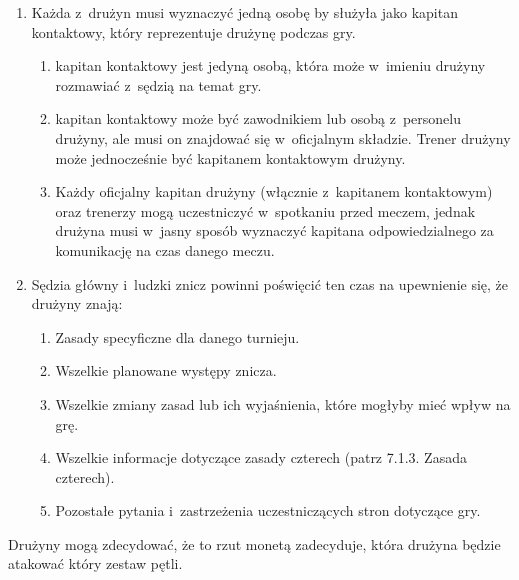 \documentclass[12pt,a4paper]{article}
\renewcommand{\subsubsection}[1]{
  \oldsubsubsection{#1}%
  \leftskip1.3cm
}
\begin{document}
\begin{enumerate}
	\item
	      Każda z~drużyn musi wyznaczyć jedną osobę by służyła jako kapitan
	      kontaktowy, który reprezentuje drużynę podczas gry.

	      \begin{enumerate}
		      \item
		            kapitan kontaktowy jest jedyną osobą, która może w~imieniu drużyny
		            rozmawiać z~sędzią na temat gry.
		      \item
		            kapitan kontaktowy może być zawodnikiem lub osobą z~personelu
		            drużyny, ale musi on znajdować się w~oficjalnym składzie. Trener
		            drużyny może jednocześnie być kapitanem kontaktowym drużyny.
		      \item
		            Każdy oficjalny kapitan drużyny (włącznie z~kapitanem kontaktowym)
		            oraz trenerzy mogą uczestniczyć w~spotkaniu przed meczem, jednak
		            drużyna musi w~jasny sposób wyznaczyć kapitana odpowiedzialnego za
		            komunikację na czas danego meczu.
	      \end{enumerate}
	\item
	      Sędzia główny i~ludzki znicz powinni poświęcić ten czas na upewnienie
	      się, że drużyny znają:

	      \begin{enumerate}
		      \item
		            Zasady specyficzne dla danego turnieju.
		      \item
		            Wszelkie planowane występy znicza.
		      \item
		            Wszelkie zmiany zasad lub ich wyjaśnienia, które mogłyby mieć wpływ
		            na grę.
		      \item
		            Wszelkie informacje dotyczące zasady czterech (patrz 7.1.3. Zasada
		            czterech).
		      \item
		            Pozostałe pytania i~zastrzeżenia uczestniczących stron dotyczące
		            gry.
	      \end{enumerate}
\end{enumerate}

\subsubsection{Rzut monetą}
Drużyny mogą zdecydować, że to rzut
monetą zadecyduje, która drużyna będzie atakować który zestaw pętli.
\end{document}
